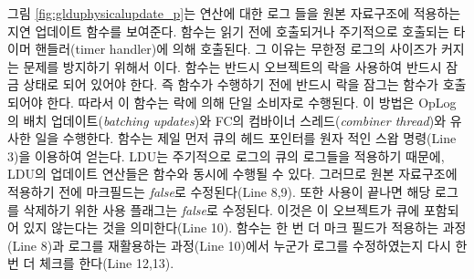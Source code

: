 그림 \ref{fig:glduphysicalupdate_p}는 연산에 대한 로그 들을 원본 자료구조에 적용하는 지연 업데이트 함수를 보여준다. 
 함수는 읽기 전에 호출되거나 주기적으로 호출되는 타이머 핸들러(timer handler)에 의해
호출된다. 
그 이유는 무한정 로그의 사이즈가 커지는 문제를 방지하기 위해서 이다.
 함수는 반드시 오브젝트의 락을 사용하여 반드시 잠금 상태로 되어 있어야 한다.
즉  함수가 수행하기 전에 반드시 락을 잠그는 함수가 호출되어야 한다.
따라서 이 함수는 락에 의해 단일 소비자로 수행된다. 
이 방법은 OpLog의 배치 업데이트(\textit{batching updates})와 FC의 컴바이너 
스레드(\textit{combiner thread})와 유사한 일을 수행한다. 
 함수는 제일 먼저 큐의 헤드 포인터를 원자 적인 스왑 명령(Line 3)을 이용하여 
얻는다.
LDU는 주기적으로 로그의 큐의 로그들을 적용하기 때문에, LDU의 업데이트 연산들은  함수와 
동시에 수행될 수 있다. 
그러므로 원본 자료구조에 적용하기 전에 마크필드는 \textit{false}로 수정된다(Line 8,9).
또한 사용이 끝나면 해당 로그를 삭제하기 위한 사용 플래그는 \textit{false}로 수정된다. 
이것은 이 오브젝트가 큐에 포함되어 있지 않는다는 것을 의미한다(Line 10).
 함수는 한 번 더 마크 필드가 적용하는 과정(Line 8)과 로그를 재활용하는 과정(Line
10)에서 누군가 로그를 수정하였는지 다시 한번 더 체크를 한다(Line 12,13).


